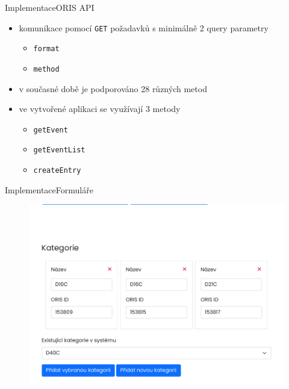 \documentclass[aspectratio=169]{beamer}
\begin{document}
\begin{frame}{Implementace}{ORIS API}
    \begin{itemize}
        \item komunikace pomocí \texttt{GET} požadavků s minimálně 2 query parametry
        \begin{itemize}
            \item \texttt{format}
            \item \texttt{method}
        \end{itemize}
        \item v současné době je podporováno 28 různých metod
        \item ve vytvořené aplikaci se využívají 3 metody
        \begin{itemize}
            \item \texttt{getEvent}
            \item \texttt{getEventList}
            \item \texttt{createEntry}
        \end{itemize}
    \end{itemize}
\end{frame}

\begin{frame}{Implementace}{Formuláře}
    \begin{figure}
        \includegraphics[width=0.7\linewidth, cfbox=lightgray 0.5pt 5pt]{images/categories.pdf}
    \end{figure}
\end{frame}
\end{document}
